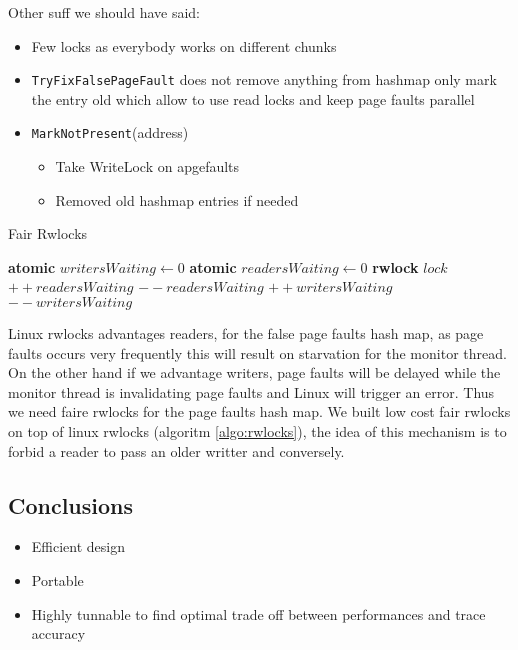 Other suff we should have said:
\begin{itemize}
    \item Few locks as everybody works on different chunks
    \item \texttt{TryFixFalsePageFault} does not remove anything from hashmap
        only mark the entry old which allow to use read locks and keep
        page faults parallel
    \item \texttt{MarkNotPresent}(address)
        \begin{itemize}
            \item Take WriteLock on apgefaults
            \item Removed old hashmap entries if needed
        \end{itemize}
\end{itemize}

\begin{algorithm}[htb]
    \caption{Fair Rwlocks}
    \label{algo:rwlocks}
    \begin{algorithmic}[1]
    \State \textbf{atomic} {$writersWaiting \gets 0$}
    \State \textbf{atomic} $readersWaiting \gets 0$
    \State \textbf{rwlock} $lock$
        \State $++readersWaiting$
            \State {}
        \EndWhile
        \State {}
        \State $--readersWaiting$
    \EndFunction
        \State {}
    \EndFunction
            \State {}
        \EndWhile
        \State $++writersWaiting$
        \State {}
        \State $--writersWaiting$
    \EndFunction
        \State {}
    \EndFunction
    \end{algorithmic}
\end{algorithm}

Linux rwlocks advantages readers, for the false page faults hash map, as page
faults occurs very frequently this will result on starvation for the monitor
thread. On the other hand if we advantage writers, page faults will be delayed
while the monitor thread is invalidating page faults and Linux will trigger an
error. Thus we need faire rwlocks for the page faults hash map. We built
low cost fair rwlocks on top of linux rwlocks (algoritm \ref{algo:rwlocks}),
the idea of this mechanism is to forbid a reader to pass an older writter and
conversely.

\subsection{Conclusions}

\begin{itemize}
    \item Efficient design
    \item Portable
    \item Highly tunnable to find optimal trade off between performances and
        trace accuracy
\end{itemize}

